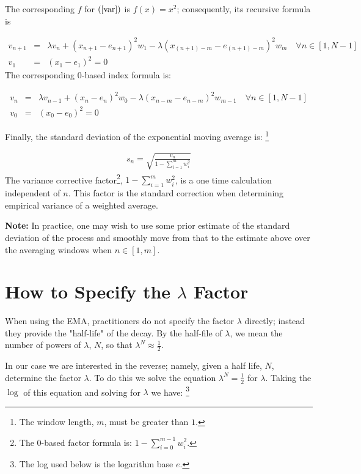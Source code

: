 \documentclass{article}
\begin{document}
The corresponding $f$ for $(\ref{var})$ is $f(x) = x^2$; 
consequently, its recursive formula is 

\begin{eqnarray}
    v_{n+1} & = & \lambda v_n + ( x_{n+1} - e_{n+1} )^2 w_1 - \lambda ( x_{(n+1)-m} - e_{(n+1)-m} )^2 w_m \quad \forall n \in [1, N-1] \\
    v_1  & = & (x_1 - e_1)^2 = 0
\end{eqnarray}
The corresponding 0-based index formula is:

\begin{eqnarray}
    v_{n} & = & \lambda v_{n-1} + ( x_{n} - e_{n} )^2 w_0 - \lambda ( x_{n-m} - e_{n-m} )^2 w_{m-1} \quad \forall n \in [1, N-1] \\
    v_0  & = & (x_0 - e_0)^2 = 0
\end{eqnarray}

Finally, the standard deviation of the exponential moving average is:%
\footnote{The window length, $m$, must be greater than $1$.}

\begin{eqnarray}
    s_{n} = \sqrt{\frac{v_n}{1 - \sum_{i=1}^m w_i^2}} 
\end{eqnarray}
The variance corrective factor\footnote{The 0-based factor formula is: $1 - \sum_{i=0}^{m-1} w_i^2$.}, $1 - \sum_{i=1}^m w_i^2$,
is a one time calculation independent of $n$. This factor is the standard 
correction when determining empirical variance of a weighted average.

{\bf Note:\/} In practice, one may wish to use some prior estimate of the standard deviation of the process
and smoothly move from that to the estimate above over the averaging windows when $n \in [1, m]$.


\section{How to Specify the $\lambda$ Factor}
When using the EMA, practitioners do not specify the factor $\lambda$ directly; 
instead they provide the "half-life" of the decay.
By the half-file of $\lambda$, we mean the number of powers of $\lambda$, $N$, so that
$\lambda^N \approx \frac{1}{2}$. 

In our case we are interested in the reverse; namely, given a half life, $N$, 
determine the factor $\lambda$. To do this we solve the equation $\lambda^N = \frac{1}{2}$
for $\lambda$.
Taking the $\log$ of this equation and solving for $\lambda$ we have:%
\footnote{The log used below is the logarithm base $e$.}
\end{document}
